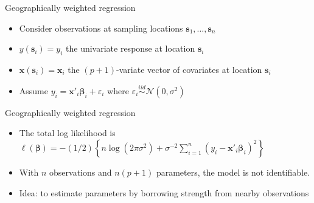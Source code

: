 \documentclass[12pt,t]{beamer}
\newcommand{\subt}[1]{{\footnotesize \color{subtitle} {#1}}}
\begin{document}
\begin{frame}{Geographically weighted regression}
\subt{\citep{Brundson:1998a, Fotheringham:2002}}

\bigskip
\begin{itemize}
  \item Consider observations at sampling locations $\bm{s}_1, \dots, \bm{s}_n$
  \item $y(\bm{s}_i) = y_i$ the univariate response at location $\bm{s}_i$
  \item $\bm{x}(\bm{s}_i) = \bm{x}_i$ the $(p+1)$-variate vector of covariates at location $\bm{s}_i$
  \item Assume $y_i = \bm{x}'_i \bm{\beta}_i + \varepsilon_i$ where $\varepsilon_i \overset{iid}{\sim} \mathcal{N} \left( 0,\sigma^2 \right)$
\end{itemize} 

\end{frame}





\begin{frame}{Geographically weighted regression}
\subt{\citep{Brundson:1998a, Fotheringham:2002}}

\bigskip
\begin{itemize}
  \item The total log likelihood is $\ell\left( \bm{\beta} \right) = - \left(1/2\right) \left\{ n \log \left( 2 \pi \sigma^2\right) +  \sigma^{-2}  \sum_{i=1}^n \left(y_i - \bm{x}'_i\bm{\beta}_i \right)^2  \right\}$
  \item With $n$ observations and $n(p+1)$ parameters, the model is not identifiable.
  \item Idea: to estimate parameters by borrowing strength from nearby observations
\end{itemize} 

\end{frame}
\end{document}
